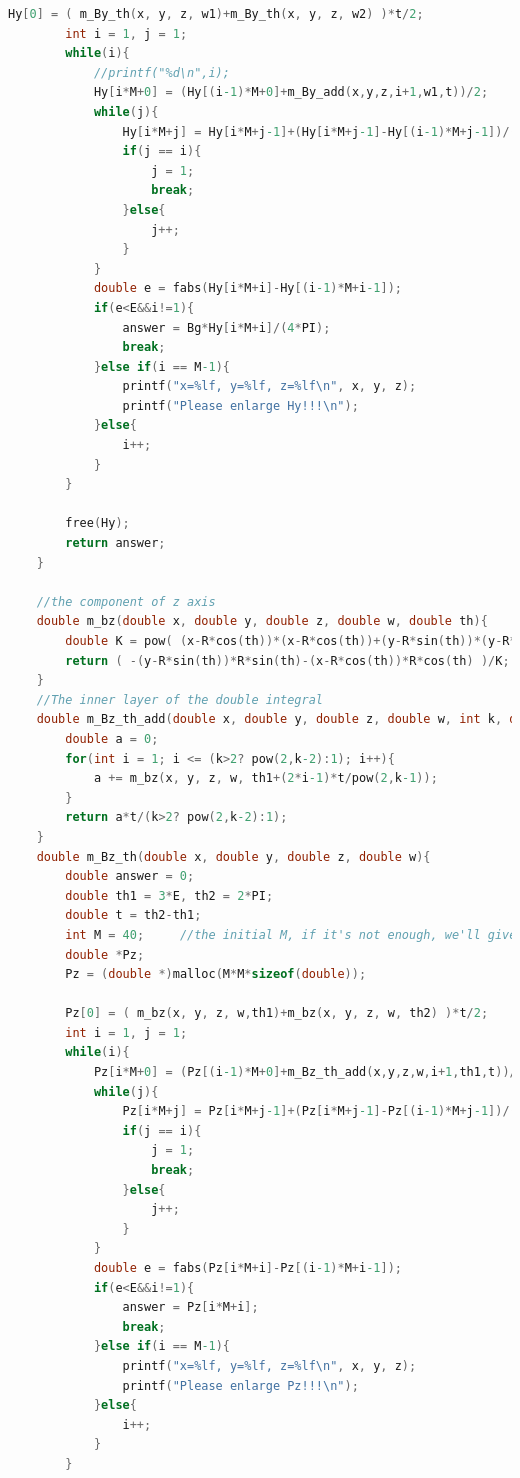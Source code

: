\documentclass[AutoFakeBold]{LZUThesis}
\begin{document}
\begin{lstlisting}[language = C]
        Hy[0] = ( m_By_th(x, y, z, w1)+m_By_th(x, y, z, w2) )*t/2;
        int i = 1, j = 1;
        while(i){
            //printf("%d\n",i);
            Hy[i*M+0] = (Hy[(i-1)*M+0]+m_By_add(x,y,z,i+1,w1,t))/2;
            while(j){
                Hy[i*M+j] = Hy[i*M+j-1]+(Hy[i*M+j-1]-Hy[(i-1)*M+j-1])/(pow(4,j)-1);
                if(j == i){
                    j = 1;
                    break;
                }else{
                    j++;
                }
            }
            double e = fabs(Hy[i*M+i]-Hy[(i-1)*M+i-1]);
            if(e<E&&i!=1){
                answer = Bg*Hy[i*M+i]/(4*PI);
                break;
            }else if(i == M-1){
                printf("x=%lf, y=%lf, z=%lf\n", x, y, z);
                printf("Please enlarge Hy!!!\n");
            }else{
                i++;
            }
        }
    
        free(Hy);
        return answer;
    }
    
    //the component of z axis
    double m_bz(double x, double y, double z, double w, double th){
        double K = pow( (x-R*cos(th))*(x-R*cos(th))+(y-R*sin(th))*(y-R*sin(th))+(z-w)*(z-w) , 1.5);
        return ( -(y-R*sin(th))*R*sin(th)-(x-R*cos(th))*R*cos(th) )/K;
    }
    //The inner layer of the double integral
    double m_Bz_th_add(double x, double y, double z, double w, int k, double th1, double t){
        double a = 0;
        for(int i = 1; i <= (k>2? pow(2,k-2):1); i++){
            a += m_bz(x, y, z, w, th1+(2*i-1)*t/pow(2,k-1));
        }
        return a*t/(k>2? pow(2,k-2):1);
    }
    double m_Bz_th(double x, double y, double z, double w){
        double answer = 0;
        double th1 = 3*E, th2 = 2*PI;
        double t = th2-th1;
        int M = 40;     //the initial M, if it's not enough, we'll give you an alert and you need to enlarge M
        double *Pz;
        Pz = (double *)malloc(M*M*sizeof(double));
    
        Pz[0] = ( m_bz(x, y, z, w,th1)+m_bz(x, y, z, w, th2) )*t/2;
        int i = 1, j = 1;
        while(i){
            Pz[i*M+0] = (Pz[(i-1)*M+0]+m_Bz_th_add(x,y,z,w,i+1,th1,t))/2;
            while(j){
                Pz[i*M+j] = Pz[i*M+j-1]+(Pz[i*M+j-1]-Pz[(i-1)*M+j-1])/(pow(4,j)-1);
                if(j == i){
                    j = 1;
                    break;
                }else{
                    j++;
                }
            }
            double e = fabs(Pz[i*M+i]-Pz[(i-1)*M+i-1]);
            if(e<E&&i!=1){
                answer = Pz[i*M+i];
                break;
            }else if(i == M-1){
                printf("x=%lf, y=%lf, z=%lf\n", x, y, z);
                printf("Please enlarge Pz!!!\n");
            }else{
                i++;
            }
        }
    

\end{lstlisting}
\end{document}
